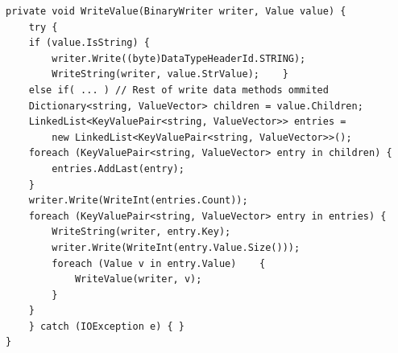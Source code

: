 \documentclass[12pt,a4paper]{article}
\begin{document}
\begin{lstlisting}[caption={WriteValue excerpt},label={lst:writeValueExcerpt}]
private void WriteValue(BinaryWriter writer, Value value) {                                                                                                                  
	try {                                                                                                              
	if (value.IsString) {                                                                                                          
		writer.Write((byte)DataTypeHeaderId.STRING);                                                           
		WriteString(writer, value.StrValue);	}
	else if( ... ) // Rest of write data methods ommited
	Dictionary<string, ValueVector> children = value.Children;                                                 
	LinkedList<KeyValuePair<string, ValueVector>> entries = 
		new LinkedList<KeyValuePair<string, ValueVector>>();
	foreach (KeyValuePair<string, ValueVector> entry in children) {                                                                                                          
		entries.AddLast(entry);                                                                                
	}                                                                                                                                                                                                                                     
	writer.Write(WriteInt(entries.Count));                                                                                                                                                                                                
	foreach (KeyValuePair<string, ValueVector> entry in entries) {                                                                                                          
		WriteString(writer, entry.Key);                                                                        
		writer.Write(WriteInt(entry.Value.Size()));                                                            
		foreach (Value v in entry.Value)	{                                                                                                      
			WriteValue(writer, v);                                                                             
		}                                                                                                      
	}                                                                                                          
	} catch (IOException e) { }                                                                                      
}                       
\end{lstlisting}
\end{document}
